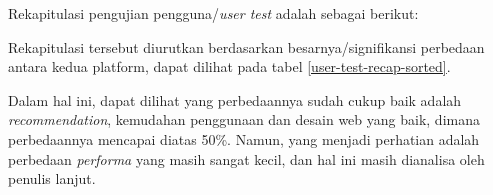 Rekapitulasi pengujian pengguna/\textit{user test} adalah sebagai berikut:


\indent Rekapitulasi tersebut diurutkan berdasarkan besarnya/signifikansi perbedaan antara kedua platform, dapat dilihat pada tabel \ref{user-test-recap-sorted}.

Dalam hal ini, dapat dilihat yang perbedaannya sudah cukup baik adalah \textit{recommendation}, kemudahan penggunaan dan desain web yang baik, dimana perbedaannya mencapai diatas 50\%. Namun, yang menjadi perhatian adalah perbedaan \textit{performa} yang masih sangat kecil, dan hal ini masih dianalisa oleh penulis lanjut.